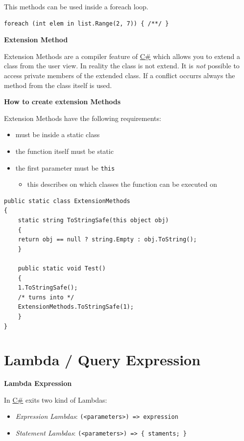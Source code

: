 \documentclass[11pt,twoside,landscape]{article}
\begin{document}
\begin{multicols}{3}
This methods can be used inside a foreach loop.
\lstset{language=csharp,label= ,caption= ,captionpos=b,numbers=none}
\begin{lstlisting}
foreach (int elem in list.Range(2, 7)) { /**/ }
\end{lstlisting}

\textbf{Extension Method}

Extension Methods are a compiler feature of \href{../../../roam/20211003114158-c.org}{C\#} which allows you to extend a class from the user view.
In reality the class is not extend.
It is \emph{not} possible to access private members of the extended class.
If a conflict occurrs always the method from the class itself is used.

\textbf{How to create extension Methods}

Extension Methods have the following requirements:
\begin{itemize}
\item must be inside a static class
\item the function itself must be static
\item the first parameter must be \texttt{this}
\begin{itemize}
\item this describes on which classes the function can be executed on
\end{itemize}
\end{itemize}

\lstset{language=csharp,label= ,caption= ,captionpos=b,numbers=none}
\begin{lstlisting}
public static class ExtensionMethods
{
    static string ToStringSafe(this object obj)
    {
	return obj == null ? string.Empty : obj.ToString();
    }

    public static void Test()
    {
	1.ToStringSafe();
	/* turns into */
	ExtensionMethods.ToStringSafe(1);
    }
}
\end{lstlisting}

\section{Lambda / Query Expression}
\label{sec:org01d4ba5}

\textbf{Lambda Expression}

In \href{../../../roam/20211003114158-c.org}{C\#} exits two kind of Lambdas:
\begin{itemize}
\item \emph{Expression Lambdas}:  \texttt{(<parameters>) => expression}
\item \emph{Statement Lambdas}: \texttt{(<parameters>) => \{ staments; \}}
\end{itemize}



\end{multicols}
\end{document}

